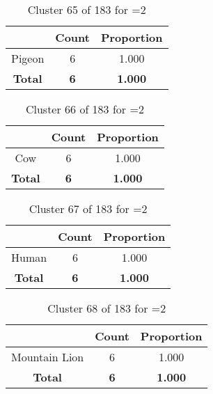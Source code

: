 \begin{table}[ht!]
\centering
\begin{tabular}{|c|c|c|}
\hline
\bf \Spec{} &\bf Count &\bf Proportion\\ \hline \hline
Pigeon & 6 & 1.000\\ \hline
\hline
\bf Total & \bf 6 & \bf 1.000\\ \hline
\end{tabular}
\label{tab:cluster:65:2}
\caption{Cluster 65 of 183 for \minneigh{}=2}
\end{table}

\begin{table}[ht!]
\centering
\begin{tabular}{|c|c|c|}
\hline
\bf \Spec{} &\bf Count &\bf Proportion\\ \hline \hline
Cow & 6 & 1.000\\ \hline
\hline
\bf Total & \bf 6 & \bf 1.000\\ \hline
\end{tabular}
\label{tab:cluster:66:2}
\caption{Cluster 66 of 183 for \minneigh{}=2}
\end{table}

\begin{table}[ht!]
\centering
\begin{tabular}{|c|c|c|}
\hline
\bf \Spec{} &\bf Count &\bf Proportion\\ \hline \hline
Human & 6 & 1.000\\ \hline
\hline
\bf Total & \bf 6 & \bf 1.000\\ \hline
\end{tabular}
\label{tab:cluster:67:2}
\caption{Cluster 67 of 183 for \minneigh{}=2}
\end{table}

\begin{table}[ht!]
\centering
\begin{tabular}{|c|c|c|}
\hline
\bf \Spec{} &\bf Count &\bf Proportion\\ \hline \hline
Mountain Lion & 6 & 1.000\\ \hline
\hline
\bf Total & \bf 6 & \bf 1.000\\ \hline
\end{tabular}
\label{tab:cluster:68:2}
\caption{Cluster 68 of 183 for \minneigh{}=2}
\end{table}

